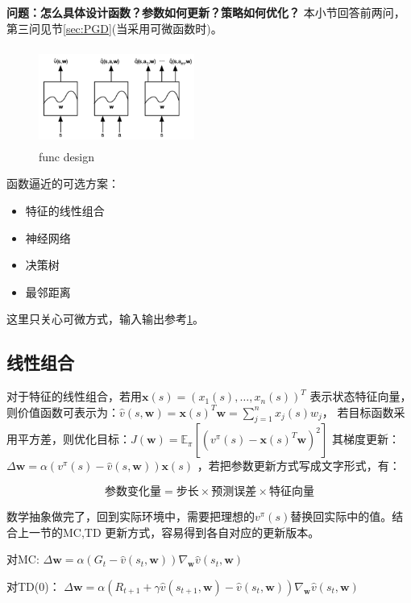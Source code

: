 \documentclass[UTF8]{ctexart}
\begin{document}
\textbf{问题：怎么具体设计函数？参数如何更新？策略如何优化？}
本小节回答前两问，第三问见节\ref{sec:PGD}(当采用可微函数时)。

\begin{figure}[htbp]
	\centering
	\includegraphics[width=5.1cm, height=3.2cm]{./pic/func_design.png}
    \caption{func design}
    \label{func:design}
\end{figure}

函数逼近的可选方案：
\begin{itemize}
    \item 特征的线性组合
    \item 神经网络
    \item 决策树
    \item 最邻距离
\end{itemize}
这里只关心可微方式，输入输出参考\ref{func:design}。

\subsection{线性组合}

对于特征的线性组合，若用$\mathbf{x}(s)=\left(x_{1}(s), \ldots, x_{n}(s)\right)^{T}$
表示状态特征向量，则价值函数可表示为：$\hat{v}(s, \mathbf{w})=\mathbf{x}(s)^{T} \mathbf{w}=\sum_{j=1}^{n} x_{j}(s) w_{j}$，
若目标函数采用平方差，则优化目标：$J(\mathbf{w})=\mathbb{E}_{\pi}\left[\left(v^{\pi}(s)-\mathbf{x}(s)^{T} \mathbf{w}\right)^{2}\right]$
其梯度更新：$\Delta \mathbf{w}=\alpha\left(v^{\pi}(s)-\hat{v}(s, \mathbf{w})\right) \mathbf{x}(s)$
，若把参数更新方式写成文字形式，有：

$$\textbf{参数变化量} = \textbf{步长} \times \textbf{预测误差} \times \textbf{特征向量}$$

数学抽象做完了，回到实际环境中，需要把理想的$v^{\pi}(s)$替换回实际中的值。结合上一节的MC,TD
更新方式，容易得到各自对应的更新版本。

对MC: 
$\Delta \mathbf{w}=\alpha\left(G_{t}-\hat{v}(s_t, \mathbf{w})\right) \nabla_{\mathbf{w}} \hat{v}\left(s_{t}, \mathbf{w}\right)$

对TD(0)：
$\Delta \mathbf{w}=\alpha\left(R_{t+1} + \gamma \hat{v}(s_{t+1}, \mathbf{w})-\hat{v}(s_t, \mathbf{w})\right) \nabla_{\mathbf{w}} \hat{v}\left(s_{t}, \mathbf{w}\right)$
\end{document}
